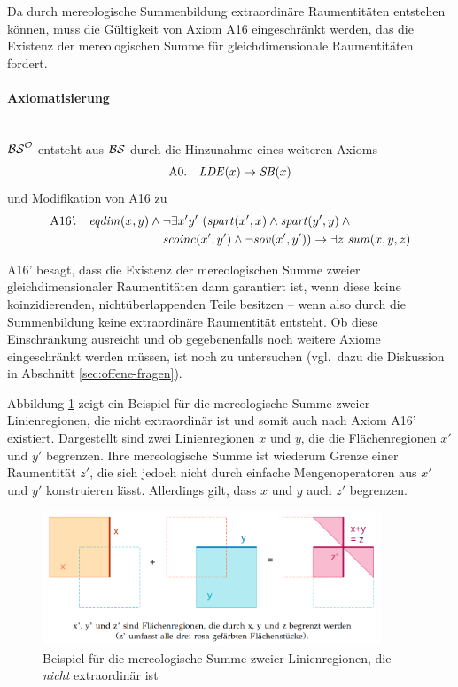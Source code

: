 Da durch mereologische Summenbildung extraordinäre Raumentitäten entstehen können, muss die Gültigkeit von Axiom A16 eingeschränkt werden, das die Existenz der mereologischen Summe für gleichdimensionale Raumentitäten fordert.

\paragraph{Axiomatisierung}\ \\
$\mathcal{BS}^{\mathcal{O}}$ entsteht aus $\mathcal{BS}$ durch die Hinzunahme eines weiteren Axioms
$$\text{A0.} \quad \mathit{LDE}(x) \to \mathit{S\hspace*{-0.25ex}B}(x)$$
und Modifikation von A16 zu
\begin{align*}
 \text{A16'.} \quad \Geqdim(x,y) \wedge \mbox{} &\neg \exists x'y'\ (\Gspart(x',x) \wedge \Gspart(y',y) \wedge \mbox{} \\
 &\Gscoinc(x',y') \wedge \neg \Gsov(x',y')) \to \exists z\ \Gsum(x,y,z)
\end{align*}

A16' besagt, dass die Existenz der mereologischen Summe zweier gleichdimensionaler Raumentitäten dann garantiert ist, wenn diese keine koinzidierenden, nichtüberlappenden Teile besitzen -- wenn also durch die Summenbildung keine extraordinäre Raumentität entsteht.
Ob diese Einschränkung ausreicht und ob gegebenenfalls noch weitere Axiome eingeschränkt werden müssen, ist noch zu untersuchen (vgl.\ dazu die Diskussion in Abschnitt \ref{sec:offene-fragen}).

Abbildung \ref{fig:summe-linien} zeigt ein Beispiel für die mereologische Summe zweier Linienregionen, die nicht extraordinär ist und somit auch nach Axiom A16' existiert.
Dargestellt sind zwei Linienregionen $x$ und $y$, die die Flächenregionen $x'$ und $y'$ begrenzen.
Ihre mereologische Summe ist wiederum Grenze einer Raumentität $z'$, die sich jedoch nicht durch einfache Mengenoperatoren aus $x'$ und $y'$ konstruieren lässt.
Allerdings gilt, dass $x$ und $y$ auch $z'$ begrenzen.

\begin{figure}[ht]
    \centering
    \includegraphics[width=0.9\textwidth]{gfx/summe-linien.png}
    \caption{Beispiel für die mereologische Summe zweier Linienregionen, die \textit{nicht} extraordinär ist}
    \label{fig:summe-linien}
\end{figure}

